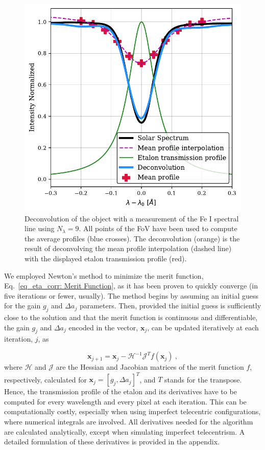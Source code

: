 \begin{figure}
\centering
\includegraphics[width=\textwidth]{figures/EtalonPaper/Deconvolution.pdf}
\caption[Object deconvolution.]{Deconvolution of the object with a measurement of the Fe I spectral line using $N_\lambda = 9$. All points of the FoV have been used to compute the average profiles (blue crosses). The deconvolution (orange) is the result of deconvolving the mean profile interpolation (dashed line) with the displayed etalon transmission profile (red).\label{fig_etalon_corr:Deconvolution} }
\end{figure}

We employed Newton's method to minimize the merit function, Eq.~\eqref{eq_eta_corr: Merit Function}, as it has been proven to quickly converge (in five iterations or fewer, usually). The method begins by assuming an initial guess for the gain $g_j$ and $\Delta a_j$ parameters. Then, provided the initial guess is sufficiently close to the solution and that the merit function is continuous and differentiable, the gain $g_j$ and $\Delta a_j$ encoded in the vector, $\mathbf{x}_j$, can be updated iteratively at each iteration, $j$, as

\begin{equation}
\mathbf{x} _ {j + 1} = \mathbf{x} _ j - \mathcal{H} ^ {- 1} \mathcal{J} ^ T f(\mathbf{x}_j) \ , 
\end{equation}
where $\mathcal{H}$ and $\mathcal{J}$ are the Hessian and Jacobian matrices of the merit function $f$, respectively, calculated for $\mathbf{x}_j = [g_j,\Delta a_j]^T$, and $T$ stands for the transpose. Hence, the transmission profile of the etalon and its derivatives have to be computed for every wavelength and every pixel at each iteration. This can be computationally costly, especially when using imperfect telecentric configurations, where numerical integrals are involved. All derivatives needed for the algorithm are calculated analytically, except when simulating imperfect telecentrism. A detailed formulation of these derivatives is provided in the appendix.

